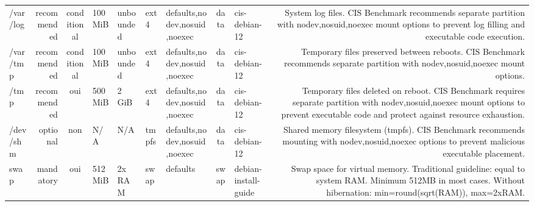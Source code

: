 \documentclass[10pt,a4paper]{article}
\begin{document}
{\begin{longtable}{M R S Z Z T O C I N}
/var/log & \textcolor{cHigh}{recommended} & conditional & 100 MiB & unbounded & ext4 & defaults,nodev,nosuid,noexec & data & cis-debian-12 & System log files. CIS Benchmark recommends separate partition with nodev,nosuid,noexec mount options to prevent log filling and executable code execution.\\
/var/tmp & \textcolor{cHigh}{recommended} & conditional & 100 MiB & unbounded & ext4 & defaults,nodev,nosuid,noexec & data & cis-debian-12 & Temporary files preserved between reboots. CIS Benchmark recommends separate partition with nodev,nosuid,noexec mount options.\\
/tmp & \textcolor{cHigh}{recommended} & \textcolor{cOk}{oui} & 500 MiB & 2 GiB & ext4 & defaults,nodev,nosuid,noexec & data & cis-debian-12 & Temporary files deleted on reboot. CIS Benchmark requires separate partition with nodev,nosuid,noexec mount options to prevent executable code and protect against resource exhaustion.\\
/dev/shm & \textcolor{cLow}{optional} & non & N/A & N/A & tmpfs & defaults,nodev,nosuid,noexec & data & cis-debian-12 & Shared memory filesystem (tmpfs). CIS Benchmark recommends mounting with nodev,nosuid,noexec options to prevent malicious executable placement.\\
swap & \textcolor{cBlock}{mandatory} & \textcolor{cOk}{oui} & 512 MiB & 2x RAM & swap & defaults & swap & debian-install-guide & Swap space for virtual memory. Traditional guideline: equal to system RAM. Minimum 512MB in most cases. Without hibernation: min=round(sqrt(RAM)), max=2xRAM.\\
\bottomrule\end{longtable}}
\end{document}
